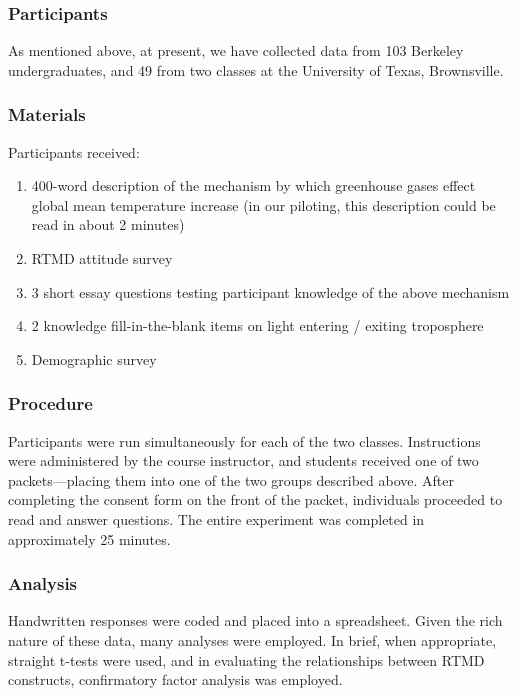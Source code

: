 \subsubsection{Participants}

As mentioned above, at present, we have collected data from 103 Berkeley
undergraduates, and 49 from two classes at the University of Texas,
Brownsville.

\subsubsection{Materials}

Participants received:

\begin{enumerate}
    \item 400-word description of the mechanism 
        by which greenhouse gases effect global mean temperature increase (in our
        piloting, this description could be read in about 2 minutes)
    \item RTMD attitude survey
    \item 3 short essay questions testing participant knowledge of the above
        mechanism
    \item 2 knowledge fill-in-the-blank items on light entering / exiting
        troposphere
    \item Demographic survey
\end{enumerate}

\subsubsection{Procedure}

Participants were run simultaneously for each of the two classes. Instructions
were administered by the course instructor, and students received one of two
packets---placing them into one of the two groups described above. After
completing the consent form on the front of the packet, individuals proceeded to
read and answer questions. The entire experiment was completed in approximately
25 minutes.

\subsubsection{Analysis}

Handwritten responses were coded and placed into a spreadsheet. Given the rich
nature of these data, many analyses were employed. In brief, when appropriate,
straight t-tests were used, and in evaluating the relationships between RTMD
constructs, confirmatory factor analysis was employed.

